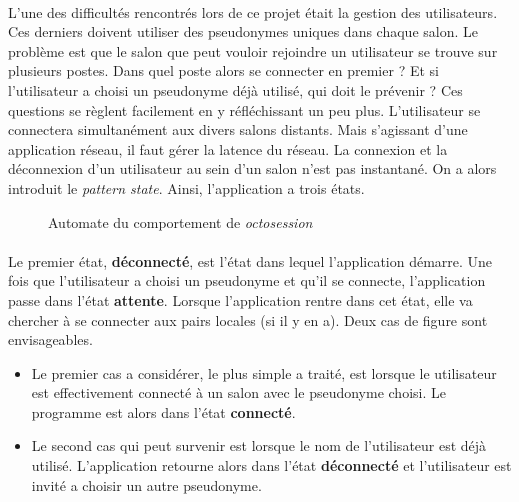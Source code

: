 \documentclass[a4paper]{article}
\begin{document}
			\paragraph{}{
			L'une des difficultés rencontrés lors de ce projet était la gestion des utilisateurs. Ces derniers doivent
			utiliser des pseudonymes uniques dans chaque salon. Le problème est que le salon que peut vouloir rejoindre un
			utilisateur se trouve sur plusieurs postes. Dans quel poste alors se connecter en premier ? Et si l'utilisateur
			a choisi un pseudonyme déjà utilisé, qui doit le prévenir ? Ces questions se règlent facilement en y
			réfléchissant un peu plus. L'utilisateur se connectera simultanément aux divers salons distants.
			Mais s'agissant d'une application réseau, il faut gérer la latence du réseau. La connexion et la 
			déconnexion d'un utilisateur au sein d'un salon n'est pas instantané. On a alors introduit le 
			\textit{pattern state}. Ainsi, l'application a trois états.
			}
			
			\begin{figure}[!h]
				\centering
				
				\caption{\label{state_schema} Automate du comportement de \textit{octosession}}
			\end{figure}
			
			\paragraph{}{Le premier état, \textbf{déconnecté}, est l'état dans lequel l'application démarre. Une fois que
			l'utilisateur a choisi un pseudonyme et qu'il se connecte, l'application passe dans l'état \textbf{attente}.
			Lorsque l'application rentre dans cet état, elle va chercher à se connecter aux pairs locales (si il y en
			a). \newline
			Deux cas de figure sont envisageables. 
			    \begin{itemize}
	                \item Le premier cas a considérer, le plus simple a traité, est lorsque le utilisateur 
	                est effectivement connecté à un salon avec le pseudonyme choisi. Le programme est 
	                alors dans l'état \textbf{connecté}.
		            \item Le second cas qui peut survenir est lorsque le nom de l'utilisateur est déjà 
		            utilisé. L'application retourne alors dans l'état \textbf{déconnecté} et l'utilisateur 
		            est invité a choisir un autre pseudonyme.
			    \end{itemize}
			}
			
\end{document}
